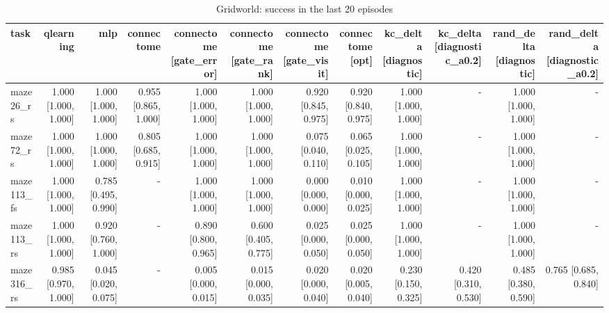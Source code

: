 \begin{table}[t]
\centering
\small
\begin{tabular}{lrrrrrrrrrrr}
\toprule
task & qlearning & mlp & connectome & connectome [gate\_error] & connectome [gate\_rank] & connectome [gate\_visit] & connectome [opt] & kc\_delta [diagnostic] & kc\_delta [diagnostic\_a0.2] & rand\_delta [diagnostic] & rand\_delta [diagnostic\_a0.2] \\
\midrule
maze26\_rs & 1.000 [1.000, 1.000] & 1.000 [1.000, 1.000] & 0.955 [0.865, 1.000] & 1.000 [1.000, 1.000] & 1.000 [1.000, 1.000] & 0.920 [0.845, 0.975] & 0.920 [0.840, 0.975] & 1.000 [1.000, 1.000] & - & 1.000 [1.000, 1.000] & - \\
maze72\_rs & 1.000 [1.000, 1.000] & 1.000 [1.000, 1.000] & 0.805 [0.685, 0.915] & 1.000 [1.000, 1.000] & 1.000 [1.000, 1.000] & 0.075 [0.040, 0.110] & 0.065 [0.025, 0.105] & 1.000 [1.000, 1.000] & - & 1.000 [1.000, 1.000] & - \\
maze113\_fs & 1.000 [1.000, 1.000] & 0.785 [0.495, 0.990] & - & 1.000 [1.000, 1.000] & 1.000 [1.000, 1.000] & 0.000 [0.000, 0.000] & 0.010 [0.000, 0.025] & 1.000 [1.000, 1.000] & - & 1.000 [1.000, 1.000] & - \\
maze113\_rs & 1.000 [1.000, 1.000] & 0.920 [0.760, 1.000] & - & 0.890 [0.800, 0.965] & 0.600 [0.405, 0.775] & 0.025 [0.000, 0.050] & 0.025 [0.000, 0.050] & 1.000 [1.000, 1.000] & - & 1.000 [1.000, 1.000] & - \\
maze316\_rs & 0.985 [0.970, 1.000] & 0.045 [0.020, 0.075] & - & 0.005 [0.000, 0.015] & 0.015 [0.000, 0.035] & 0.020 [0.000, 0.040] & 0.020 [0.005, 0.040] & 0.230 [0.150, 0.325] & 0.420 [0.310, 0.530] & 0.485 [0.380, 0.590] & 0.765 [0.685, 0.840] \\
\bottomrule
\end{tabular}
\caption{Gridworld: success in the last 20 episodes}
\label{tab:gridworld_final20}
\end{table}